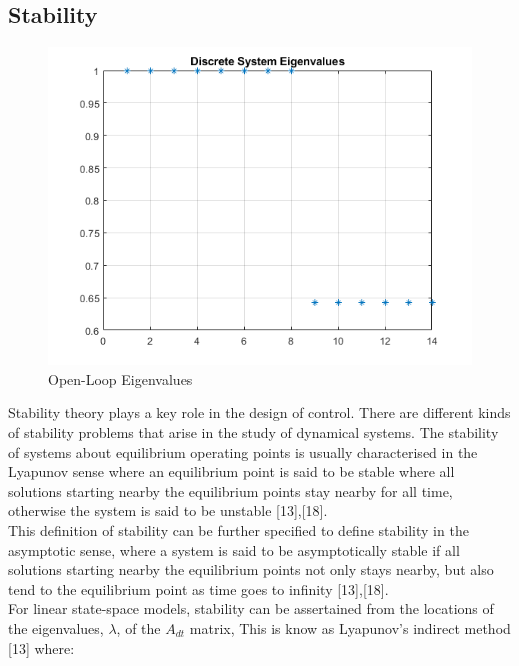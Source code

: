 \documentclass[12pt,a4paper,twoside]{report}
\begin{document}
			\subsection{Stability}
			
				\begin{figure}[h!]
					\centering
					\includegraphics[width=0.8\linewidth]{DiscreteSystemPoles.png}
					\caption{Open-Loop Eigenvalues}
					\label{fig:discretesystemeigenvalues}
				\end{figure}
			
				Stability theory plays a key role in the design of control. There are different kinds of stability problems that arise in the study of dynamical systems. The stability of systems about equilibrium operating points is usually characterised in the Lyapunov sense where an equilibrium point is said to be stable where all solutions starting nearby the equilibrium points stay nearby for all time, otherwise the system is said to be unstable [13],[18]. 
				\\
				This definition of stability can be further specified to define stability in the asymptotic sense, where a system is said to be asymptotically stable if all solutions starting nearby the equilibrium points not only stays nearby, but also tend to the equilibrium point as time goes to infinity [13],[18].
				\\
				For linear state-space models, stability can be assertained from the locations of the eigenvalues, $\lambda$, of the $A_{dt}$ matrix, This is know as Lyapunov's indirect method [13] where:
				
\end{document}
